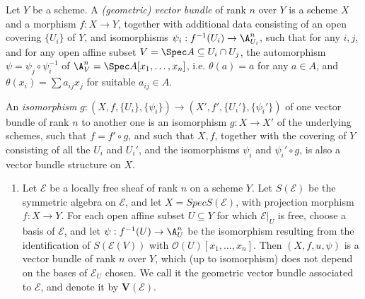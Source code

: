 \begin{exercise}%
	Let $Y $ be a scheme. A \textit{(geometric) vector bundle} of rank $n $ over $Y $ is a scheme $X $ and a morphism $f: X\to Y$, together with additional data consisting of an open covering $\{U_i\}   $ of $Y $, and isomorphisms $\psi_i: f^{-1}(U_i) \to \A^n_{U_i} $, such that for any $i,j $, and for any open affine subset $V = \Spec A \subseteq  U_i \cap U_j $, the automorphism $\psi = \psi_j\circ \psi_i ^{-1} $ of $\A^n_V = \Spec A[x_{1}, \ldots ,x_n] $, i.e. $\theta(a) = a $ for any $a \in A $, and $\theta (x_i) = \sum a_{ij}x_j $ for suitable $a_{ij} \in A $.

	An \textit{isomorphism} $g: (X,f,\{U_i\} ,\{\psi_i\} ) \to (X',f',\{U_i'\} ,\{\psi_i'\} )     $ of one vector bundle of rank $n $ to another one is an isomorphism $g: X\to X' $ of the underlying schemes, such that $f=  f' \circ g $, and such that $X,f $, together with the covering of $Y $ consisting of all the $U_i $ and $U_i' $, and the isomorphisms $\psi_i $ and $\psi_i'\circ g $, is also a vector bundle structure on $X $.
	\begin{enumerate}
		\item Let $\mathscr{E} $ be a locally free sheaf of rank $n $ on a scheme $Y $. Let $S(\mathscr{E})$ be the symmetric algebra on $\mathscr{E}$, and let $X = Spec S(\mathscr{E})$, with projection morphism $f:X \to Y$. For each open affine subset $U \subseteq Y$ for which $\mathscr{E}|_U $ is free, choose a basis of $\mathscr{E}$, and let $\psi: f^{-1}(U) \to \A^n_U $ be the isomorphism resulting from the identification of $S(\mathscr{E}(V))$ with $\mathcal{O}(U)[x_{1}, \ldots , x_n]$. Then $(X,f,{u},{\psi})$ is a vector bundle of rank $n$ over $Y$, which (up to isomorphism) does not depend on the bases of $\mathscr{E}_U$ chosen. We call it the geometric vector bundle associated to $\mathscr{E}$, and denote it by $\bm{V}(\mathscr{E})$.

\end{enumerate}
\end{exercise}
